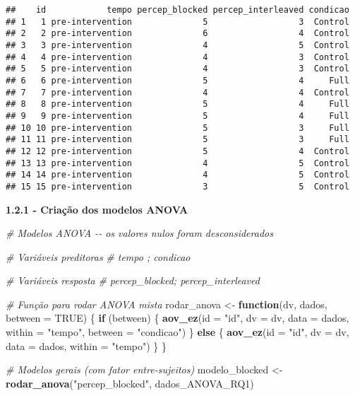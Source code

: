 \documentclass[
]{article}
\newenvironment{Shaded}{\begin{snugshade}}{\end{snugshade}}
\newcommand{\AttributeTok}[1]{\textcolor[rgb]{0.13,0.29,0.53}{#1}}
\newcommand{\CommentTok}[1]{\textcolor[rgb]{0.56,0.35,0.01}{\textit{#1}}}
\newcommand{\ConstantTok}[1]{\textcolor[rgb]{0.56,0.35,0.01}{#1}}
\newcommand{\ControlFlowTok}[1]{\textcolor[rgb]{0.13,0.29,0.53}{\textbf{#1}}}
\newcommand{\FunctionTok}[1]{\textcolor[rgb]{0.13,0.29,0.53}{\textbf{#1}}}
\newcommand{\NormalTok}[1]{#1}
\newcommand{\OtherTok}[1]{\textcolor[rgb]{0.56,0.35,0.01}{#1}}
\newcommand{\StringTok}[1]{\textcolor[rgb]{0.31,0.60,0.02}{#1}}
\begin{document}
\begin{verbatim}
##    id            tempo percep_blocked percep_interleaved condicao
## 1   1 pre-intervention              5                  3  Control
## 2   2 pre-intervention              6                  4  Control
## 3   3 pre-intervention              4                  5  Control
## 4   4 pre-intervention              4                  3  Control
## 5   5 pre-intervention              4                  3  Control
## 6   6 pre-intervention              5                  4     Full
## 7   7 pre-intervention              4                  4  Control
## 8   8 pre-intervention              5                  4     Full
## 9   9 pre-intervention              5                  4     Full
## 10 10 pre-intervention              5                  3     Full
## 11 11 pre-intervention              5                  3     Full
## 12 12 pre-intervention              5                  4  Control
## 13 13 pre-intervention              4                  5  Control
## 14 14 pre-intervention              4                  5  Control
## 15 15 pre-intervention              3                  5  Control
\end{verbatim}

\textbf{1.2.1 - Criação dos modelos ANOVA}

\begin{Shaded}
\begin{Highlighting}[]
\CommentTok{\# Modelos ANOVA {-}{-} os valores nulos foram desconsiderados}

\CommentTok{\# Variáveis preditoras}
\CommentTok{\# tempo ; condicao}

\CommentTok{\# Variáveis resposta}
\CommentTok{\# percep\_blocked; percep\_interleaved}

\CommentTok{\# Função para rodar ANOVA mista}
\NormalTok{rodar\_anova }\OtherTok{\textless{}{-}} \ControlFlowTok{function}\NormalTok{(dv, dados, }\AttributeTok{between =} \ConstantTok{TRUE}\NormalTok{) \{}
  \ControlFlowTok{if}\NormalTok{ (between) \{}
    \FunctionTok{aov\_ez}\NormalTok{(}\AttributeTok{id =} \StringTok{"id"}\NormalTok{, }\AttributeTok{dv =}\NormalTok{ dv, }\AttributeTok{data =}\NormalTok{ dados, }\AttributeTok{within =} \StringTok{"tempo"}\NormalTok{,}
           \AttributeTok{between =} \StringTok{"condicao"}\NormalTok{)}
\NormalTok{  \} }\ControlFlowTok{else}\NormalTok{ \{}
    \FunctionTok{aov\_ez}\NormalTok{(}\AttributeTok{id =} \StringTok{"id"}\NormalTok{, }\AttributeTok{dv =}\NormalTok{ dv, }\AttributeTok{data =}\NormalTok{ dados, }\AttributeTok{within =} \StringTok{"tempo"}\NormalTok{)}
\NormalTok{  \}}
\NormalTok{\}}

\CommentTok{\# Modelos gerais (com fator entre{-}sujeitos)}
\NormalTok{modelo\_blocked }\OtherTok{\textless{}{-}} \FunctionTok{rodar\_anova}\NormalTok{(}\StringTok{"percep\_blocked"}\NormalTok{, dados\_ANOVA\_RQ1)}
\end{Highlighting}
\end{Shaded}
\end{document}
